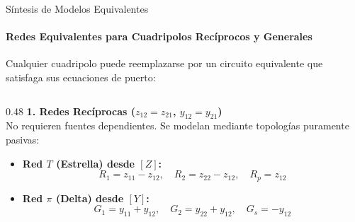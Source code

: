 \documentclass[10pt, aspectratio=169]{beamer}
\begin{document}
\begin{frame}{Síntesis de Modelos Equivalentes}
    \framesubtitle{Redes Equivalentes para Cuadripolos Recíprocos y Generales}

    Cualquier cuadripolo puede reemplazarse por un circuito equivalente que satisfaga sus ecuaciones de puerto:

    \vspace{0.3cm}
    \begin{columns}[t]
        \begin{column}{0.48\textwidth}
            \textbf{1. Redes Recíprocas ($z_{12}=z_{21}$, $y_{12}=y_{21}$)} \\
            No requieren fuentes dependientes. Se modelan mediante topologías puramente pasivas:
            \begin{itemize}
                \item \textbf{Red $T$ (Estrella) desde $[Z]$:}
                      \begin{equation*}
                          R_1 = z_{11} - z_{12}, \quad R_2 = z_{22} - z_{12}, \quad R_p = z_{12}
                      \end{equation*}
                \item \textbf{Red $\pi$ (Delta) desde $[Y]$:}
                      \begin{equation*}
                          G_1 = y_{11} + y_{12}, \quad G_2 = y_{22} + y_{12}, \quad G_s = -y_{12}
                      \end{equation*}
            \end{itemize}
        \end{column}


\end{columns}
\end{frame}
\end{document}

